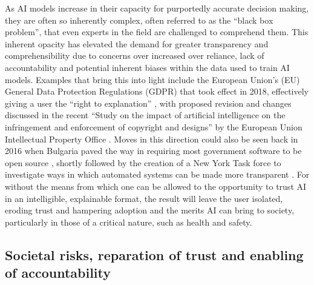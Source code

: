 As AI models increase in their capacity for purportedly accurate decision making, they are often so inherently complex, often referred to as the “black box problem”, that even experts in the field are challenged to comprehend them. This inherent opacity has elevated the demand for greater transparency and comprehensibility due to concerns over increased over reliance, lack of accountability and potential inherent biases within the data used to train AI models. Examples that bring this into light include the European Union’s (EU) General Data Protection Regulations (GDPR) that took effect in 2018,  effectively giving a user the “right to explanation” \cite{goodmanEuropeanUnionRegulations2017a}, with proposed revision and changes discussed in the recent “Study on the impact of artificial intelligence on the infringement and enforcement of copyright and designs” by the European Union Intellectual Property Office \cite{europeanunionintellectualpropertyoffice.StudyImpactArtificial2022}. Moves in this direction could also be seen back in 2016 when Bulgaria paved the way in requiring most government software to be open source \cite{coldeweyBulgariaNowRequires2016}, shortly followed by the creation of a New York Task force to investigate ways in which automated systems can be made more transparent \cite{wiggersNewYorkCity2018}. For without the means from which one can be allowed to the opportunity to trust AI in an intelligible, explainable format, the result will leave the user isolated, eroding trust and hampering adoption and the merits AI can bring to society, particularly in those of a critical nature, such as health and safety. 

\subsection{Societal risks, reparation of trust and enabling of accountability}

